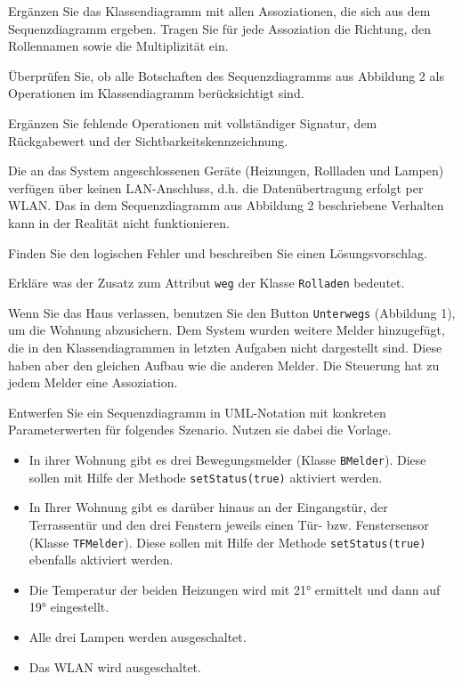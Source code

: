 \documentclass[a4paper]{scrartcl}
\begin{document}
\begin{aufgabe}[points=9]
Ergänzen Sie das Klassendiagramm mit allen Assoziationen, die sich aus dem
Sequenzdiagramm ergeben. Tragen Sie für jede Assoziation die Richtung, den
Rollennamen sowie die Multiplizität ein.

\end{aufgabe}

\begin{aufgabe}[points=7]
Überprüfen Sie, ob alle Botschaften des Sequenzdiagramms aus Abbildung 2 als
Operationen im Klassendiagramm berücksichtigt sind.

Ergänzen Sie fehlende Operationen mit vollständiger Signatur, dem Rückgabewert und
der Sichtbarkeitskennzeichnung.
\end{aufgabe}


\begin{aufgabe}[points=1]
Die an das System angeschlossenen Geräte (Heizungen, Rollladen und Lampen)
verfügen über keinen LAN-Anschluss, d.h. die Datenübertragung erfolgt per WLAN.
Das in dem Sequenzdiagramm aus Abbildung 2 beschriebene Verhalten kann in der Realität
nicht funktionieren.

Finden Sie den logischen Fehler und beschreiben Sie einen Lösungsvorschlag.
\end{aufgabe}


\begin{aufgabe}[points=2]
Erkläre was der Zusatz zum Attribut \texttt{weg} der Klasse \texttt{Rolladen} bedeutet.
\end{aufgabe}

\begin{aufgabe}[points=15]
Wenn Sie das Haus verlassen, benutzen Sie den Button \texttt{Unterwegs} (Abbildung 1), um die
Wohnung abzusichern. Dem System wurden weitere Melder hinzugefügt, die in den
Klassendiagrammen in letzten Aufgaben nicht dargestellt sind. Diese haben aber
den gleichen Aufbau wie die anderen Melder. Die Steuerung hat zu
jedem Melder eine Assoziation.

Entwerfen Sie ein Sequenzdiagramm in UML-Notation mit konkreten Parameterwerten
für folgendes Szenario. Nutzen sie dabei die Vorlage.


\begin{itemize}
\item In ihrer Wohnung gibt es drei Bewegungsmelder (Klasse \texttt{BMelder}). Diese sollen
mit Hilfe der Methode \texttt{setStatus(true)} aktiviert werden.
\item  In Ihrer Wohnung gibt es darüber hinaus an der Eingangstür, der Terrassentür
und den drei Fenstern jeweils einen Tür- bzw. Fenstersensor (Klasse
\texttt{TFMelder}). Diese sollen mit Hilfe der Methode \texttt{setStatus(true)} ebenfalls aktiviert werden.
\item  Die Temperatur der beiden Heizungen wird mit 21° ermittelt und dann auf 19°
eingestellt.
\item Alle drei Lampen werden ausgeschaltet.
\item Das WLAN wird ausgeschaltet.
\end{itemize}
\end{aufgabe}
\end{document}
